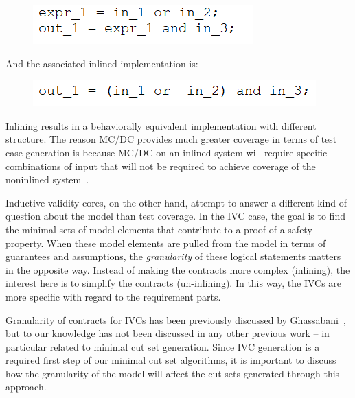 \begin{figure}[h]
	\begin{center}
		\includegraphics[scale=1.0]{images/uninlinedEx.PNG}
	\end{center}
	\vspace{-1.5em}
\end{figure}

And the associated inlined implementation is: 

\begin{figure}[h]
	\begin{center}
		\includegraphics[scale=1.0]{images/inlined.PNG}
	\end{center}
	\vspace{-1.5em}
\end{figure}

Inlining results in a behaviorally equivalent implementation with different structure. The reason MC/DC provides much greater coverage in terms of test case generation is because MC/DC on an inlined system will require specific combinations of input that will not be required to achieve coverage of the noninlined system~\cite{gay2016effect}. 

Inductive validity cores, on the other hand, attempt to answer a different kind of question about the model than test coverage. In the IVC case, the goal is to find the minimal sets of model elements that contribute to a proof of a safety property. When these model elements are pulled from the model in terms of guarantees and assumptions, the \emph{granularity} of these logical statements matters in the opposite way. Instead of making the contracts more complex (inlining), the interest here is to simplify the contracts (un-inlining). In this way, the IVCs are more specific with regard to the requirement parts.

Granularity of contracts for IVCs has been previously discussed by Ghassabani~\cite{ghassabani_2018}, but to our knowledge has not been discussed in any other previous work -- in particular related to minimal cut set generation. Since IVC generation is a required first step of our minimal cut set algorithms, it is important to discuss how the granularity of the model will affect the cut sets generated through this approach. 

